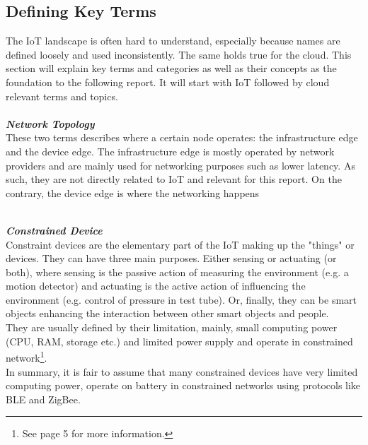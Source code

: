 \subsection{Defining Key Terms}
The IoT landscape is often hard to understand, especially because names are defined loosely and  used inconsistently. The same holds true for the cloud. This section will explain key terms and categories as well as their concepts as the foundation to the following report. It will start with IoT followed by cloud relevant terms and topics. \\

\vspace{0.5mm}\\
\textbf\textit{Network Topology}\\
These two terms describes where a certain node operates: the infrastructure edge and the device edge.
The infrastructure edge is mostly operated by network providers
and are mainly used for networking purposes such as lower latency.
As such, they are not directly related to IoT and relevant for this report.
On the contrary, the device edge is where the networking happens




\vspace{0.5mm}\\
\textbf{\textit{Constrained Device}}\\
Constraint devices are the elementary part of the IoT making up the "things" or devices\cite{contstraintDevicesTerminology}.
They can have three main purposes.
Either sensing or actuating (or both), where sensing is the passive action of measuring the environment (e.g. a motion detector) and actuating is the active action of influencing the environment (e.g. control of pressure in test tube). Or, finally, they can be smart objects enhancing the interaction between other smart objects and people.\\
They are usually defined by their limitation, mainly, small computing power (CPU, RAM, storage etc.) and limited power supply and operate in constrained network\footnote{See \cite{contstraintDevicesTerminology} page 5 for more information.}.\\
In summary, it is fair to assume that many constrained devices have very limited computing power, operate on battery in constrained networks using protocols like BLE and ZigBee. \\

